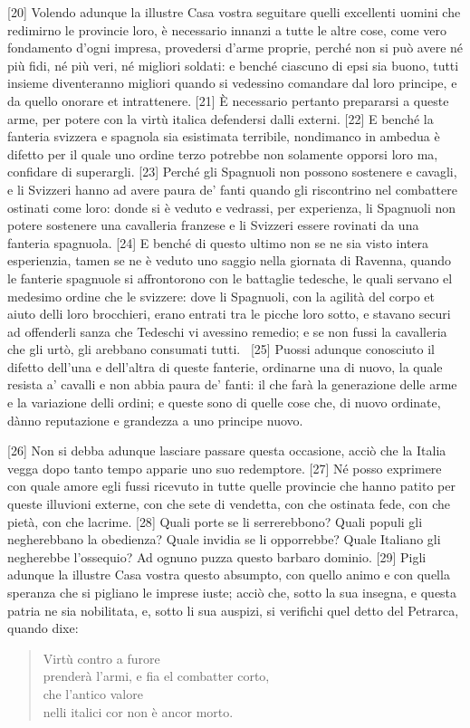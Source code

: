 {[}20{]}  Volendo adunque la illustre Casa vostra seguitare quelli excellenti
uomini che redimirno le provincie loro, è necessario innanzi a tutte
le altre cose, come vero fondamento d'ogni impresa, provedersi d'arme
proprie, perché non si può avere né più fidi, né più veri, né migliori
soldati: e benché ciascuno di epsi sia buono, tutti insieme
diventeranno migliori quando si vedessino comandare dal loro principe,
e da quello onorare et intrattenere. {[}21{]} È necessario pertanto
prepararsi a queste arme, per potere con la virtù italica defendersi
dalli externi. {[}22{]} E benché la fanteria svizzera e spagnola sia
esistimata terribile, nondimanco in ambedua è difetto per il quale uno
ordine terzo potrebbe non solamente opporsi loro ma, confidare di
superargli. {[}23{]} Perché gli Spagnuoli non possono sostenere e
cavagli, e li Svizzeri hanno ad avere paura de' fanti quando gli
riscontrino nel combattere ostinati come loro: donde si è veduto e
vedrassi, per experienza, li Spagnuoli non potere sostenere una
cavalleria franzese e li Svizzeri essere rovinati da una fanteria
spagnuola. {[}24{]} E benché di questo ultimo non se ne sia visto
intera esperienzia, tamen se ne è veduto uno saggio nella giornata di
Ravenna, quando le fanterie spagnuole si affrontorono con le battaglie
tedesche, le quali servano el medesimo ordine che le svizzere: dove li
Spagnuoli, con la agilità del corpo et aiuto delli loro brocchieri,
erano entrati tra le picche loro sotto, e stavano securi ad offenderli
sanza che Tedeschi vi avessino remedio; e se non fussi la cavalleria
che gli urtò, gli arebbano consumati tutti. \est\ {[}25{]} Puossi adunque
conosciuto il difetto dell'una e dell'altra di queste fanterie,
ordinarne una di nuovo, la quale resista a' cavalli e non abbia paura
de' fanti: il che farà la generazione delle arme e la variazione delli
ordini; e queste sono di quelle cose che, di nuovo ordinate, dànno
reputazione e grandezza a uno principe nuovo.


{[}26{]} Non si debba adunque lasciare passare questa occasione, acciò
che la Italia vegga dopo tanto tempo apparie uno suo redemptore.
{[}27{]} Né posso exprimere con quale amore egli fussi ricevuto in tutte
quelle provincie che hanno patito per queste illuvioni externe, con che
sete di vendetta, con che ostinata fede, con che pietà, con che lacrime.
{[}28{]} Quali porte se li serrerebbono? Quali populi gli negherebbano
la obedienza? Quale invidia se li opporrebbe? Quale Italiano gli
negherebbe l'ossequio? Ad ognuno puzza questo barbaro dominio. {[}29{]}
Pigli adunque la illustre Casa vostra questo absumpto, con quello animo
e con quella speranza che si pigliano le imprese iuste; acciò che, sotto
la sua insegna, e questa patria ne sia nobilitata, e, sotto li sua
auspizi, si verifichi quel detto del Petrarca, quando dixe:


\begin{verse}
Virtù contro a furore\\
prenderà l'armi, e fia el combatter corto,\\
che l'antico valore\\
nelli italici cor non è ancor morto.
\end{verse}


